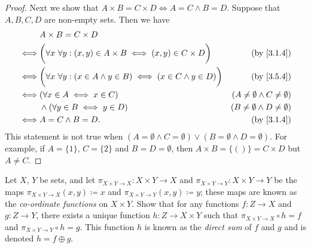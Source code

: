 \begin{proof}
  Next we show that \(A \times B = C \times D \iff A = C \land B = D\).
  Suppose that \(A, B, C, D\) are non-empty sets.
  Then we have
  \begin{align*}
         & A \times B = C \times D                                                                                                              \\
    \iff & \bigg(\forall x \ \forall y : (x, y) \in A \times B \iff (x, y) \in C \times D\bigg)     & \text{(by \cref{3.1.4})}                  \\
    \iff & \bigg(\forall x \ \forall y : (x \in A \land y \in B) \iff (x \in C \land y \in D)\bigg) & \text{(by \cref{3.5.4})}                  \\
    \iff & (\forall x \in A \iff x \in C)                                                           & (A \neq \emptyset \land C \neq \emptyset) \\
         & \land (\forall y \in B \iff y \in D)                                                     & (B \neq \emptyset \land D \neq \emptyset) \\
    \iff & A = C \land B = D.                                                                       & \text{(by \cref{3.1.4})}
  \end{align*}
  This statement is not true when \((A = \emptyset \land C = \emptyset) \lor (B = \emptyset \land D = \emptyset)\).
  For example, if \(A = \{1\}\), \(C = \{2\}\) and \(B = D = \emptyset\), then \(A \times B = \{()\} = C \times D\) but \(A \neq C\).
\end{proof}

\begin{ex}\label{ex:3.5.7}
  Let \(X\), \(Y\) be sets, and let \(\pi_{X \times Y \to X} : X \times Y \to X\) and \(\pi_{X \times Y \to Y} : X \times Y \to Y\) be the maps \(\pi_{X \times Y \to X}(x, y) \coloneqq x\) and \(\pi_{X \times Y \to Y}(x, y) \coloneqq y\);
  these maps are known as the \emph{co-ordinate functions} on \(X \times Y\).
  Show that for any functions \(f : Z \to X\) and \(g : Z \to Y\), there exists a unique function \(h : Z \to X \times Y\) such that \(\pi_{X \times Y \to X} \circ h = f\) and \(\pi_{X \times Y \to Y} \circ h = g\).
  This function \(h\) is known as the \emph{direct sum} of \(f\) and \(g\) and is denoted \(h = f \oplus g\).
\end{ex}

